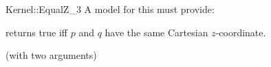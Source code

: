 \begin{ccRefFunctionObjectConcept}{Kernel::EqualZ_3}
A model for this must provide:


{returns true iff $p$ and $q$ have the same Cartesian $z$-coordinate.}

\ccRefines
{} (with two arguments)

\ccSeeAlso
{}\\

\end{ccRefFunctionObjectConcept}
